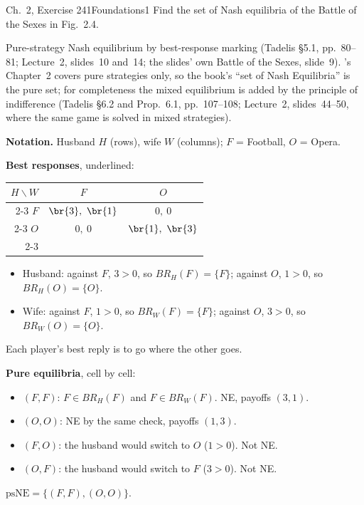 \begin{exsol}{\MG{} Ch.~2, Exercise 2}{41}{Foundations}{1}
\asked Find the set of Nash equilibria of the Battle of the Sexes in Fig.~2.4.

\method Pure-strategy Nash equilibrium by best-response marking (Tadelis \S5.1, pp.~80--81;
Lecture~2, slides~10 and~14; the slides' own Battle of the Sexes, slide~9). \MG{}'s Chapter~2
covers pure strategies only, so the book's ``set of Nash Equilibria'' is the pure set; for
completeness the mixed equilibrium is added by the principle of indifference (Tadelis \S6.2 and
Prop.~6.1, pp.~107--108; Lecture~2, slides~44--50, where the same game is solved in mixed
strategies).

\solution
\textbf{Notation.} Husband $H$ (rows), wife $W$ (columns); $F$ = Football, $O$ = Opera.

\textbf{Best responses}, underlined:
\begin{center}
\begin{tabular}{r|c|c|}
\multicolumn{1}{r}{$H \backslash W$} & \multicolumn{1}{c}{$F$} & \multicolumn{1}{c}{$O$}\\ \cline{2-3}
$F$ & $\br{3},\ \br{1}$ & $0,\ 0$ \\ \cline{2-3}
$O$ & $0,\ 0$ & $\br{1},\ \br{3}$ \\ \cline{2-3}
\end{tabular}
\end{center}
\begin{itemize}
  \item Husband: against $F$, $3 > 0$, so $BR_H(F) = \{F\}$; against $O$, $1 > 0$, so
  $BR_H(O) = \{O\}$.
  \item Wife: against $F$, $1 > 0$, so $BR_W(F) = \{F\}$; against $O$, $3 > 0$, so
  $BR_W(O) = \{O\}$.
\end{itemize}
Each player's best reply is to go where the other goes.

\textbf{Pure equilibria}, cell by cell:
\begin{itemize}
  \item $(F,F)$: $F \in BR_H(F)$ and $F \in BR_W(F)$. NE, payoffs $(3,1)$.
  \item $(O,O)$: NE by the same check, payoffs $(1,3)$.
  \item $(F,O)$: the husband would switch to $O$ ($1 > 0$). Not NE.
  \item $(O,F)$: the husband would switch to $F$ ($3 > 0$). Not NE.
\end{itemize}
$\text{psNE} = \{(F,F), (O,O)\}$.


\end{exsol}
